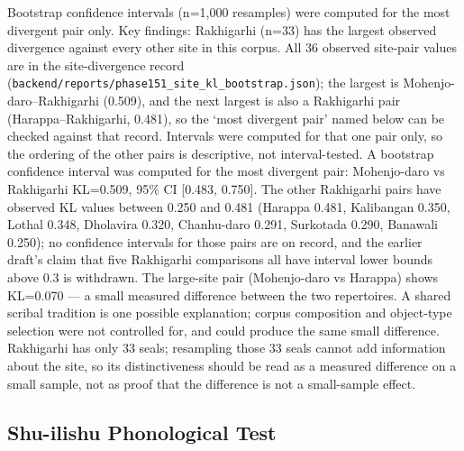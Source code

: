 \documentclass[11pt]{article}
\begin{document}
Bootstrap confidence intervals (n=1,000 resamples) were computed for the most divergent pair only. Key findings: Rakhigarhi (n=33) has the largest observed divergence against every other site in this corpus. All 36 observed site-pair values are in the site-divergence record (\texttt{backend/reports/phase151\_site\_kl\_bootstrap.json}); the largest is Mohenjo-daro--Rakhigarhi (0.509), and the next largest is also a Rakhigarhi pair (Harappa--Rakhigarhi, 0.481), so the `most divergent pair' named below can be checked against that record. Intervals were computed for that one pair only, so the ordering of the other pairs is descriptive, not interval-tested.
A bootstrap confidence interval was computed for the most divergent pair: Mohenjo-daro vs Rakhigarhi KL=0.509, 95\% CI [0.483, 0.750]. The other Rakhigarhi pairs have observed KL values between 0.250 and 0.481 (Harappa 0.481, Kalibangan 0.350, Lothal 0.348, Dholavira 0.320, Chanhu-daro 0.291, Surkotada 0.290, Banawali 0.250); no confidence intervals for those pairs are on record, and the earlier draft's claim that five Rakhigarhi comparisons all have interval lower bounds above 0.3 is withdrawn. The large-site pair (Mohenjo-daro vs Harappa) shows KL=0.070 --- a small measured difference between the two repertoires. A shared scribal tradition is one possible explanation; corpus composition and object-type selection were not controlled for, and could produce the same small difference. Rakhigarhi has only 33 seals; resampling those 33 seals cannot add information about the site, so its distinctiveness should be read as a measured difference on a small sample, not as proof that the difference is not a small-sample effect.

\subsection{Shu-ilishu Phonological Test
}\label{shu-ilishu-phonological-test-phase-152}
\end{document}
